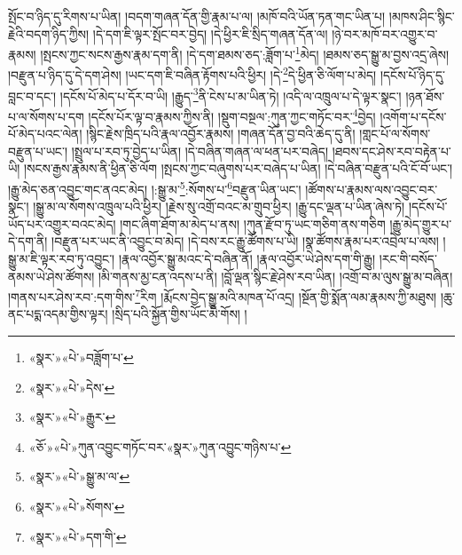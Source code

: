 སྤོང་བ་ཉིད་དུ་རིགས་པ་ཡིན། །བདག་གཞན་དོན་གྱི་རྣམ་པ་ལ། །མཁོ་བའི་ཡོན་ཏན་གང་ཡིན་པ། །མཁས་ཤིང་སྙིང་རྗེའི་བདག་ཉིད་ཀྱིས། །དེ་དག་ཇི་ལྟར་སྤོང་བར་བྱེད། །དེ་ཕྱིར་ཇི་སྲིད་གཞན་དོན་ལ། །ཉེ་བར་མཁོ་བར་འགྱུར་བ་རྣམས། །སྤངས་ཀྱང་སངས་རྒྱས་རྣམ་དག་ནི། །དེ་དག་ཐམས་ཅད་:ཟློག་པ་\footnote{«སྣར་»«པེ་»བཟློག་པ་}མེད། །ཐམས་ཅད་སྒྱུ་མ་བྱས་འདྲ་ཞེས། །བརྫུན་པ་ཉིད་དུ་དེ་དག་ཤེས། །ཡང་དག་ཇི་བཞིན་རྟོགས་པའི་ཕྱིར། །དེ་\footnote{«སྣར་»«པེ་»དེས་}དེ་ཕྱིན་ཅི་ལོག་པ་མེད། །དངོས་པོ་ཉིད་དུ་བླང་བ་དང་། །དངོས་པོ་མེད་པ་དོར་བ་ཡི། །རྒྱུད་\footnote{«སྣར་»«པེ་»རྒྱུར་}ནི་ངེས་པ་མ་ཡིན་ཏེ། །འདི་ལ་འཁྲུལ་པ་དེ་ལྟར་སྣང་། །ཉན་ཐོས་པ་ལ་སོགས་པ་དག །དངོས་པོར་ལྟ་བ་རྣམས་ཀྱིས་ནི། །སྡུག་བསྔལ་:ཀུན་ཀྱང་གཏོང་བར་\footnote{«ཅོ་»«པེ་»ཀུན་འབྱུང་གཏོང་བར་«སྣར་»ཀུན་འབྱུང་གཉིས་པ་}བྱེད། །འགོག་པ་དངོས་པོ་མེད་པའང་ལེན། །སྙིང་རྗེས་ཁྲིད་པའི་རྣལ་འབྱོར་རྣམས། །གཞན་དོན་བྱ་བའི་ཆེད་དུ་ནི། །གླང་པོ་ལ་སོགས་བརྫུན་པ་ཡང་། །སྤྲུལ་པ་རབ་ཏུ་བྱེད་པ་ཡིན། །དེ་བཞིན་གཞན་ལ་ཕན་པར་བཞེད། །ཐབས་དང་ཤེས་རབ་བརྟེན་པ་ཡི། །སངས་རྒྱས་རྣམས་ནི་ཕྱིན་ཅི་ལོག །སྤངས་ཀྱང་བཞུགས་པར་བཞེད་པ་ཡིན། །དེ་བཞིན་བརྫུན་པའི་ངོ་བོ་ཡང་། །རྒྱུ་མེད་ཅན་འབྱུང་གང་ནའང་མེད། །:སྒྱུ་མ་\footnote{«སྣར་»«པེ་»སྒྱུ་མ་ལ་}:སོགས་པ་\footnote{«སྣར་»«པེ་»སོགས་}བརྫུན་ཡིན་ཡང་། །ཚོགས་པ་རྣམས་ལས་འབྱུང་བར་སྣང་། །སྒྱུ་མ་ལ་སོགས་འཁྲུལ་པའི་ཕྱིར། །རྗེས་སུ་འགྲོ་བའང་མ་གྲུབ་ཕྱིར། །རྒྱུ་དང་ལྡན་པ་ཡིན་ཞེས་ཏེ། །དངོས་པོ་ཡོད་པར་འགྱུར་བའང་མེད། །གང་ཞིག་ཐོག་མ་མེད་པ་ནས། །ཀུན་རྫོབ་ཏུ་ཡང་གཅིག་ནས་གཅིག །རྒྱུ་མེད་གྱུར་པ་དེ་དག་ནི། །བརྫུན་པར་ཡང་ནི་འབྱུང་བ་མེད། །དེ་བས་རང་རྒྱུ་ཚོགས་པ་ཡི། །སྣ་ཚོགས་རྣམ་པར་འབྲེལ་པ་ལས། །སྒྱུ་མ་ཇི་ལྟར་རབ་ཏུ་འབྱུང་། །རྣལ་འབྱོར་སྒྱུ་མའང་དེ་བཞིན་ནོ། །རྣལ་འབྱོར་ཡེ་ཤེས་དག་གི་རྒྱུ། །རང་གི་བསོད་ནམས་ཡེ་ཤེས་ཚོགས། །མི་གནས་མྱ་ངན་འདས་པ་ནི། །བློ་ལྡན་སྙིང་རྗེ་ཤེས་རབ་ཡིན། །འགྲོ་བ་མ་ལུས་སྒྱུ་མ་བཞིན། །གནས་པར་ཤེས་རབ་:དག་གིས་\footnote{«སྣར་»«པེ་»དག་གི་}རིག །རྨོངས་བྱེད་སྒྱུ་མའི་མཁན་པོ་འདྲ། །སྔོན་གྱི་སྨོན་ལམ་རྣམས་ཀྱི་མཐུས། །ཆུ་ནང་པདྨ་འདམ་གྱིས་ལྟར། །སྲིད་པའི་སྐྱོན་གྱིས་ཡོང་མི་གོས། །
